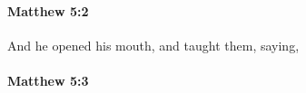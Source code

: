 		\paragraph{Matthew 5:2} %
			\label{MATTHEW-5-2}

			And he opened his mouth, and taught them, saying,

			\begin{framed}
			\scriptsize
				\begin{compactdesc}
					\item[SBLG] 
				\end{compactdesc}
			\end{framed}

		\paragraph{Matthew 5:3} %
			\label{MATTHEW-5-3}

